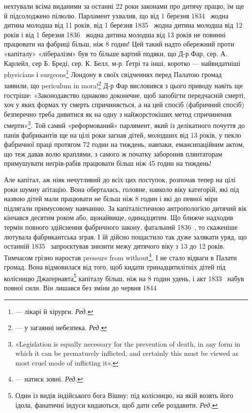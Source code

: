 \parcont{}  %
нехтували всіма виданими за останні 22 роки законами про дитячу
працю, їм ще й підсолоджено пілюлю. Парламент ухвалив, що
від 1 березня 1834~ жодна дитина молодша від 11 років, від
1 березня 1835~ жодна дитина молодша від 12 років і від 1 березня
1836~ жодна дитина молодша від 13 років не повинні
працювати на фабриці більш, ніж 8 годин! Цей такий надто обережний
проти «капіталу» «лібералізм» був то більше вартий
подяки, що Д-р Фар, сер. А. Карлейл, сер Б. Бреді, сер. К. Белл,
м-р. Ґетрі та інші, коротко — найвидатніші physicians і surgeons\footnote*{
— лікарі й хірурги. \emph{Ред.}
} Лондону в своїх свідченнях перед Палатою громад заявили, що
periculum in mora!\footnote*{
— у загаянні небезпека. \emph{Ред.}
} Д-р Фар висловився з цього приводу навіть
ще гостріше: «Законодавство однаково доконечне, щоб запобігти
передчасній смерті, хоч у яких формах ту смерть спричиняється,
а на цей спосіб (фабричний спосіб) безперечно треба дивитися
як на одну з найжорстокіших метод спричинення смерти»\footnote{
«Legislation is equally necessary for the prevention of death, in
any form in which it can be prematurely inflicted, and certainly this must
be viewed as most cruel mode of inflicting it».
}.
Той самий «реформований» парлямент, який із делікатного почуття
до панів фабрикантів ще на цілі роки загнав дітей, молодших
від 13 років, у пекло фабричної праці протягом 72 годин на
тиждень, навпаки, емансипаційним актом, що теж давав волю
краплями, з самого ж початку заборонив плянтаторам примушувати
негрів-рабів працювати більш ніж 45 годин на тиждень!

Але капітал, аж ніяк нечутливий до всіх цих поступок, розпочав
тепер на цілі роки шумну аґітацію. Вона оберталась, головне,
навколо віку категорій, які під назвою дітей мали працювати
не більш ніж 8 годин і які до певної міри підлягали примусовому
навчанню. За капіталістичною антропологією дитячий
вік кінчався десятим роком або, щонайвище, одинадцятим. Що
ближче надходив термін повного здійснення фабричного закону,
фатальний 1836~, то скаженіше лютувала фабрикантська зграя.
І їй дійсно пощастило так дуже залякати уряд, що останній
1835~ запроєктував знизити межу дитячого віку з 13 до 12 років.
Тимчасом грізно наростав pressure from without\footnote*{
— натиск зовні. \emph{Ред.}
}. І не стало відваги
в Палати громад. Вона відмовилася від того, щоб кидати
тринадцятилітніх дітей під колісницю Джаґернавта\footnote*{
Один із видів індійського бога Вішну; під колісницю, на якій возять
його ідола, фанатичні індуси кидаються, щоб дати себе роздавити. \emph{Ред.}
} капіталу
більш, ніж на 8 годин удень, і акт 1833~ набув повної сили.
Він лишався без зміни до червня 1844~

